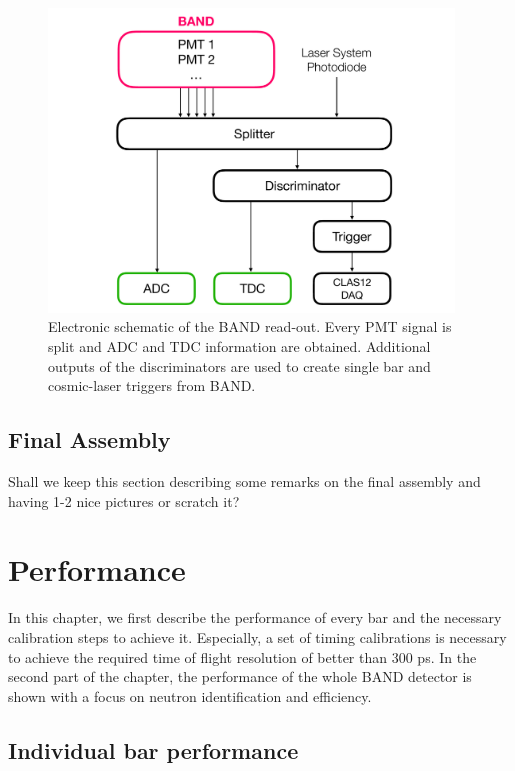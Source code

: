 \documentclass[3p,final,twocolumn]{elsarticle}
\begin{document}
\begin{figure}[h!]
	\centering
		\includegraphics[width=0.96\textwidth]{figures/electronics-diag.pdf}
	\caption{Electronic schematic of the BAND read-out. Every PMT signal is split and ADC and TDC information are obtained. Additional outputs of the discriminators are used to create single bar and cosmic-laser triggers from BAND.}
	\label{fig:electronic-diag}
\end{figure}


\subsection{Final Assembly}
{\color{red} Shall we keep this section describing some remarks on the final assembly and having 1-2 nice pictures or scratch it?}


\section{Performance}
In this chapter, we first describe the performance of every bar and the necessary calibration steps to achieve it. Especially, a set of timing calibrations is necessary to achieve the required time of flight resolution of better than 300 \si{\pico\s}.
In the second part of the chapter, the performance of the whole BAND detector is shown with a focus on neutron identification and efficiency.
\subsection{Individual bar performance}
\end{document}
